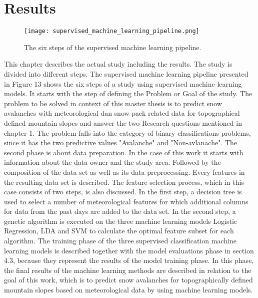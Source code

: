 \documentclass[../masterarbeit.tex]{subfiles}
\begin{document}
\section{Results}
\begin{figure}[h]
    \centering
    \texttt{[image: supervised\_machine\_learning\_pipeline.png]}
    \caption{The six steps of the supervised machine learning pipeline.}
    \end{figure} 
This chapter describes the actual study including the results. The study is divided into different steps. The supervised machine learning pipeline presented in Figure 13 shows the six steps of a study using supervised machine learning models. It starts with the step of defining the Problem or Goal of the study. 
The problem to be solved in context of this master thesis is to predict snow avalanches with meteorological dan snow pack related data for topographical defined mountain slopes and answer the two Research questions mentioned in chapter 1. The problem falls into the category of binary classifications problems, since it has the two predictive values "Avalanche" and "Non-avlanache".
The second phase is about data preparation. In the case of this work it starts with information about the data owner and the study area. Followed by the composition of the data set as well as its data preprocessing. Every features in the resulting data set is described. 
The feature selection process, which in this case consists of two steps, is also discussed. In the first step, a decision tree is used to select a number of meteorological features for which additional columns for data from the past days are added to the data set. In the second step, a genetic algorithm is executed on the three machine learning models Logistic Regression, LDA and SVM to calculate the optimal feature subset for each algorithm. 
The training phase of the three supervised classification machine learning models is described together with the model evaluations phase in section 4.3, because they represent the results of the model training phase. In this phase, the final results of the machine learning methods are described in relation to the goal of this work, which is to predict snow avalanches for topographically defined mountain slopes based on meteorological data by using machine learning models.













\clearpage
\newpage

    
  
\clearpage
\newpage

  
\clearpage
\newpage

\end{document}

